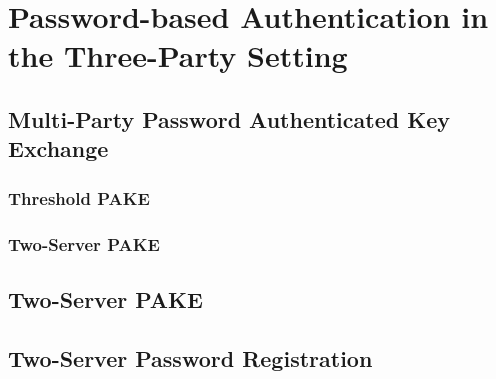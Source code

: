 \chapter{Password-based Authentication in the Three-Party Setting}

\section{Multi-Party Password Authenticated Key Exchange}

\subsection{Threshold PAKE}

\subsection{Two-Server PAKE}

\section{Two-Server PAKE}


\section{Two-Server Password Registration}
